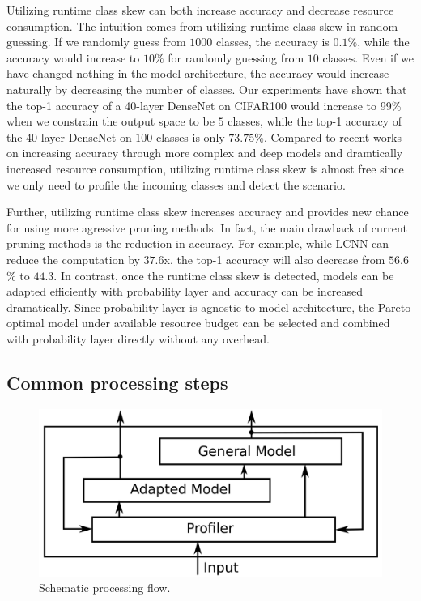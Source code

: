 \documentclass[pageno]{jpaper}
\begin{document}
Utilizing runtime class skew can both increase accuracy and decrease resource consumption. The intuition comes from utilizing runtime class skew in random guessing. If we randomly guess from $1000$ classes, the accuracy is $0.1\%$, while the accuracy would increase to $10\%$ for randomly guessing from $10$ classes. Even if we have changed nothing in the model architecture, the accuracy would increase naturally by decreasing the number of classes. Our experiments have shown that the top-1 accuracy of a 40-layer DenseNet \cite{huang2017densely} on CIFAR100 \cite{krizhevsky2009learning} would increase to 99\% when we constrain the output space to be $5$ classes, while the top-1 accuracy of the 40-layer DenseNet on $100$ classes is only $73.75$\%. Compared to recent works on increasing accuracy through more complex and deep models and dramtically increased resource consumption, utilizing runtime class skew is almost free since we only need to profile the incoming classes and detect the scenario.

Further, utilizing runtime class skew increases accuracy and provides new chance for using more agressive pruning methods. In fact, the main drawback of current pruning methods \cite{bagherinezhad2017lcnn, figurnov2016perforatedcnns, han2015deep, veniat2017learning, wen2016learning} is the reduction in accuracy. For example, while LCNN \cite{bagherinezhad2017lcnn} can reduce the computation by $37.6$x, the top-1 accuracy will also decrease from $56.6$\% to $44.3$. In contrast, once the runtime class skew is detected, models can be adapted efficiently with probability layer and accuracy can be increased dramatically. Since probability layer is agnostic to model architecture, the Pareto-optimal model under available resource budget can be selected and combined with probability layer directly without any overhead.


\subsection{Common processing steps}


\begin{figure}
  \includegraphics[scale=0.14]{profiler.png}
  \caption{Schematic processing flow.}
  \label{fig:profiler}
\end{figure}
\end{document}
